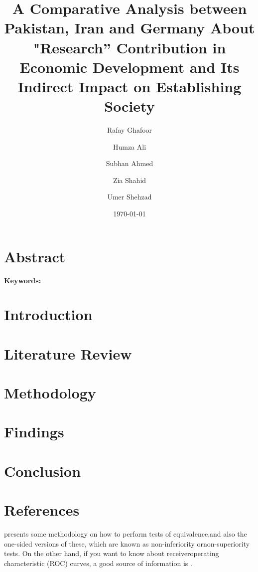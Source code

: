\documentclass[]{article}
\title{A Comparative Analysis between Pakistan, Iran and Germany About "Research” Contribution in Economic Development and Its Indirect Impact on Establishing Society}
\date{\today}
\author[1]{Rafay Ghafoor}
\author[2]{Humza Ali}
\author[3]{Subhan Ahmed}
\author[4]{Zia Shahid}
\author[5]{Umer Shehzad}
\affil{Department of Computer Science, FAST NUCES}
\begin{document}
\begin{titlingpage}
\maketitle
\end{titlingpage}

\newpage

\newpage
\tableofcontents
\newpage


\section{Abstract}
\textbf{Keywords:}
\section{Introduction}
\section{Literature Review}
\section{Methodology}
\section{Findings}
\section{Conclusion}
\section{References}
\cite{Wel03} presents some methodology on how to perform tests of equivalence,and also the one-sided versions of these, which are known as non-inferiority ornon-superiority tests. On the other hand, if you want to know about receiveroperating characteristic (ROC) curves, a good source of information is \cite{Met78}.



\end{document}
